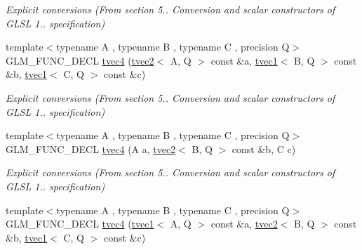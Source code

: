 \begin{DoxyCompactItemize}
\begin{DoxyCompactList}\small\item\em Explicit conversions (From section 5.. Conversion and scalar constructors of G\-L\-S\-L 1.. specification) \end{DoxyCompactList}\item 
\hypertarget{structglm_1_1tvec4_a89416d52ebe2bd443aa8883b09beeb9b}{{\footnotesize template$<$typename A , typename B , typename C , precision Q$>$ }\\G\-L\-M\-\_\-\-F\-U\-N\-C\-\_\-\-D\-E\-C\-L \hyperlink{structglm_1_1tvec4_a89416d52ebe2bd443aa8883b09beeb9b}{tvec4} (\hyperlink{structglm_1_1tvec2}{tvec2}$<$ A, Q $>$ const \&a, \hyperlink{structglm_1_1tvec1}{tvec1}$<$ B, Q $>$ const \&b, \hyperlink{structglm_1_1tvec1}{tvec1}$<$ C, Q $>$ const \&c)}\label{structglm_1_1tvec4_a89416d52ebe2bd443aa8883b09beeb9b}

\begin{DoxyCompactList}\small\item\em Explicit conversions (From section 5.. Conversion and scalar constructors of G\-L\-S\-L 1.. specification) \end{DoxyCompactList}\item 
\hypertarget{structglm_1_1tvec4_a5ef8389d321818452512275d0700f376}{{\footnotesize template$<$typename A , typename B , typename C , precision Q$>$ }\\G\-L\-M\-\_\-\-F\-U\-N\-C\-\_\-\-D\-E\-C\-L \hyperlink{structglm_1_1tvec4_a5ef8389d321818452512275d0700f376}{tvec4} (A a, \hyperlink{structglm_1_1tvec2}{tvec2}$<$ B, Q $>$ const \&b, C c)}\label{structglm_1_1tvec4_a5ef8389d321818452512275d0700f376}

\begin{DoxyCompactList}\small\item\em Explicit conversions (From section 5.. Conversion and scalar constructors of G\-L\-S\-L 1.. specification) \end{DoxyCompactList}\item 
\hypertarget{structglm_1_1tvec4_a5e240923a749e0890f023ad2982595cd}{{\footnotesize template$<$typename A , typename B , typename C , precision Q$>$ }\\G\-L\-M\-\_\-\-F\-U\-N\-C\-\_\-\-D\-E\-C\-L \hyperlink{structglm_1_1tvec4_a5e240923a749e0890f023ad2982595cd}{tvec4} (\hyperlink{structglm_1_1tvec1}{tvec1}$<$ A, Q $>$ const \&a, \hyperlink{structglm_1_1tvec2}{tvec2}$<$ B, Q $>$ const \&b, \hyperlink{structglm_1_1tvec1}{tvec1}$<$ C, Q $>$ const \&c)}\label{structglm_1_1tvec4_a5e240923a749e0890f023ad2982595cd}


\end{DoxyCompactItemize}
